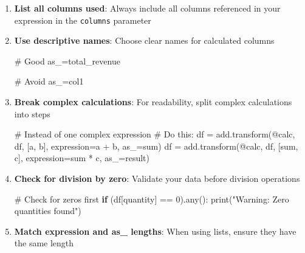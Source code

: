 \documentclass[
  letterpaper,
]{scrbook}
\newenvironment{Shaded}{\begin{snugshade}}{\end{snugshade}}
\newcommand{\BuiltInTok}[1]{\textcolor[rgb]{0.00,0.23,0.31}{#1}}
\newcommand{\CommentTok}[1]{\textcolor[rgb]{0.37,0.37,0.37}{#1}}
\newcommand{\ControlFlowTok}[1]{\textcolor[rgb]{0.00,0.23,0.31}{\textbf{#1}}}
\newcommand{\DecValTok}[1]{\textcolor[rgb]{0.68,0.00,0.00}{#1}}
\newcommand{\NormalTok}[1]{\textcolor[rgb]{0.00,0.23,0.31}{#1}}
\newcommand{\OperatorTok}[1]{\textcolor[rgb]{0.37,0.37,0.37}{#1}}
\newcommand{\StringTok}[1]{\textcolor[rgb]{0.13,0.47,0.30}{#1}}
\begin{document}
\begin{enumerate}
\def\labelenumi{\arabic{enumi}.}
\item
  \textbf{List all columns used}: Always include all columns referenced
  in your expression in the \texttt{columns} parameter
\item
  \textbf{Use descriptive names}: Choose clear names for calculated
  columns

\begin{Shaded}
\begin{Highlighting}[]
\CommentTok{\# Good}
\NormalTok{as\_}\OperatorTok{=}\StringTok{\textquotesingle{}total\_revenue\textquotesingle{}}

\CommentTok{\# Avoid}
\NormalTok{as\_}\OperatorTok{=}\StringTok{\textquotesingle{}col1\textquotesingle{}}
\end{Highlighting}
\end{Shaded}
\item
  \textbf{Break complex calculations}: For readability, split complex
  calculations into steps

\begin{Shaded}
\begin{Highlighting}[]
\CommentTok{\# Instead of one complex expression}
\CommentTok{\# Do this:}
\NormalTok{df }\OperatorTok{=}\NormalTok{ add.transform(}\StringTok{\textquotesingle{}@calc\textquotesingle{}}\NormalTok{, df, [}\StringTok{\textquotesingle{}a\textquotesingle{}}\NormalTok{, }\StringTok{\textquotesingle{}b\textquotesingle{}}\NormalTok{], expression}\OperatorTok{=}\StringTok{\textquotesingle{}a + b\textquotesingle{}}\NormalTok{, as\_}\OperatorTok{=}\StringTok{\textquotesingle{}sum\textquotesingle{}}\NormalTok{)}
\NormalTok{df }\OperatorTok{=}\NormalTok{ add.transform(}\StringTok{\textquotesingle{}@calc\textquotesingle{}}\NormalTok{, df, [}\StringTok{\textquotesingle{}sum\textquotesingle{}}\NormalTok{, }\StringTok{\textquotesingle{}c\textquotesingle{}}\NormalTok{], expression}\OperatorTok{=}\StringTok{\textquotesingle{}sum * c\textquotesingle{}}\NormalTok{, as\_}\OperatorTok{=}\StringTok{\textquotesingle{}result\textquotesingle{}}\NormalTok{)}
\end{Highlighting}
\end{Shaded}
\item
  \textbf{Check for division by zero}: Validate your data before
  division operations

\begin{Shaded}
\begin{Highlighting}[]
\CommentTok{\# Check for zeros first}
\ControlFlowTok{if}\NormalTok{ (df[}\StringTok{\textquotesingle{}quantity\textquotesingle{}}\NormalTok{] }\OperatorTok{==} \DecValTok{0}\NormalTok{).}\BuiltInTok{any}\NormalTok{():}
    \BuiltInTok{print}\NormalTok{(}\StringTok{"Warning: Zero quantities found"}\NormalTok{)}
\end{Highlighting}
\end{Shaded}
\item
  \textbf{Match expression and as\_ lengths}: When using lists, ensure
  they have the same length


\end{enumerate}
\end{document}
